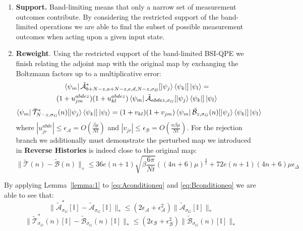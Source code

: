 \begin{enumerate}
    \item \textbf{Support.} Band-limiting means that only a narrow set of measurement outcomes contribute. By considering the restricted support of the band-limited operations we are able to find the subset of possible measurement outcomes when acting upon a given input state.
    \item \textbf{Reweight}. Using the restricted support of the band-limited BSI-QPE we finish relating the adjoint map with the original map by exchanging the Boltzmann factors up to a multiplicative error:
    \begin{multline}
  \bra{\psi_m}\tilde{\mathcal{A}}^*_{b+N-z,a+N-z,e,d,N-z,\sigma_G}[\ket{\psi_j}\bra{\psi_k}]\ket{\psi_l} 
   =\\(1+u_{jm}^{abdez})(1+u_{kl}^{abdez})\bra{\psi_m}\tilde{\mathcal{A}}_{abdez,\sigma_G}[\ket{\psi_j}\bra{\psi_k}]\ket{\psi_l}
   \label{eq:Aconditioneq}
\end{multline}
\begin{equation}
    \bra{\psi_m}\tilde{\mathcal{T}}^*_{N -z,\sigma_G}(n)[\ket{\psi_j}\bra{\psi_k}]\ket{\psi_l}
    =(1+v_{kl})(1+v_{jm})\bra{\psi_m}\tilde{\mathcal{B}}_{z,\sigma_G}(n)[\ket{\psi_j}\bra{\psi_k}]\ket{\psi_l}
    \label{eq:Bconditioneq}
\end{equation}
    where $|u_{jr}^{abde}| \leq \epsilon_{\mathcal{A}} = O(\frac{\beta \mu}{Nt})$ and $|v_{jr}| \leq \epsilon_{\mathcal{B}} = O(\frac{n\beta \mu}{Nt})$. For the rejection branch we additionally must demonstrate the perturbed map we introduced in \textbf{Reverse Histories} is indeed close to the original map:
\begin{equation}
    \|\tilde{\mathcal{T}}(n) - \tilde{\mathcal{B}}(n)\|_{\diamond} \leq 36e(n+1)\sqrt{\beta\frac{6\pi}{Nt}}((4n+6)\mu)^{\frac{3}{2}}+72e(n+1)(4n+6)\mu\epsilon_{\Delta}
    \label{eq:Wdrifterrormain}
\end{equation}
\end{enumerate}
By applying Lemma~\ref{lemma:1} to \eqref{eq:Aconditioneq} and \eqref{eq:Bconditioneq} we are able to see that:
\begin{equation}
    \|\tilde{\mathcal{A}}^*_{\sigma_G}[\mathbb{I}] - \tilde{\mathcal{A}}_{\sigma_G}[\mathbb{I}]\|_* \leq (2\epsilon_{\mathcal{A}}+ \epsilon_{\mathcal{A}}^2)\|\tilde{\mathcal{A}}_{\sigma_G}[\mathbb{I}]\|_*
    \label{eq:Aoutput}
\end{equation}
\begin{equation}
    \|\tilde{\mathcal{T}}^*_{\sigma_G}(n)[\mathbb{I}] - \tilde{\mathcal{B}}_{\sigma_G}(n)[\mathbb{I}]\|_* \leq (2\epsilon_{\mathcal{B}} + \epsilon_{\mathcal{B}}^2)\|\tilde{\mathcal{B}}_{\sigma_G}(n)[\mathbb{I}]\|_*
    \label{eq:Boutput}
\end{equation}
